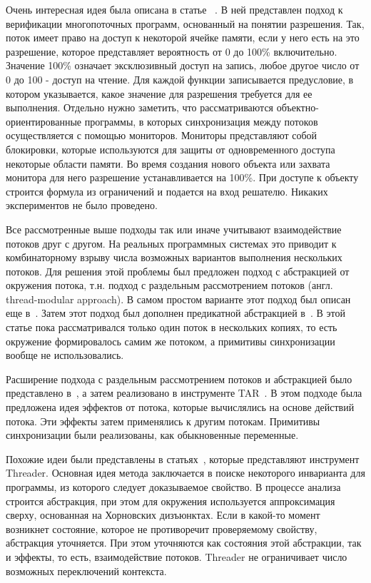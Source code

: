 Очень интересная идея была описана в статье ~\cite{Leino:2009}. В ней представлен подход к верификации многопоточных программ, основанный на понятии разрешения.
Так, поток имеет право на доступ к некоторой ячейке памяти, если у него есть на это разрешение, которое представляет вероятность от 0 до 100\% включительно.
Значение 100\% означает эксклюзивный доступ на запись, любое другое число от 0 до 100 - доступ на чтение.
Для каждой функции записывается предусловие, в котором указывается, какое значение для разрешения требуется для ее выполнения.
Отдельно нужно заметить, что рассматриваются объектно-ориентированные программы, в которых синхронизация между потоков осуществляется с помощью мониторов.
Мониторы представляют собой блокировки, которые используются для защиты от одновременного доступа некоторые области памяти.
Во время создания нового объекта или захвата монитора для него разрешение устанавливается на 100\%.
При доступе к объекту строится формула из ограничений и подается на вход решателю.
Никаких экспериментов не было проведено.

Все рассмотренные выше подходы так или иначе учитывают взаимодействие потоков друг с другом. 
На реальных программных системах это приводит к комбинаторному взрыву числа возможных вариантов выполнения нескольких потоков.
Для решения этой проблемы был предложен подход с абстракцией от окружения потока, т.н. подход с раздельным рассмотрением потоков (англ. thread-modular approach). 
В самом простом варианте этот подход был описан еще в~\cite{ThreadModular03}.
Затем этот подход был дополнен предикатной абстракцией в~\cite{Henzinger:2004}.
В этой статье пока рассматривался только один поток в нескольких копиях, то есть окружение формировалось самим же потоком, а примитивы синхронизации вообще не использовались.

Расширение подхода с раздельным рассмотрением потоков и абстракцией было представлено в~\cite{Malkis:2006}, а затем реализовано в инструменте TAR~\cite{TAR}.
В этом подходе была предложена идея эффектов от потока, которые вычислялись на основе действий потока. Эти эффекты затем применялись к другим потокам.
Примитивы синхронизации были реализованы, как обыкновенные переменные.

Похожие идеи были представлены в статьях~\cite{Threader:2011,Gupta:2011:POPL,Gupta:2011}, которые представляют инструмент Threader.
Основная идея метода заключается в поиске некоторого инварианта для программы, из которого следует доказываемое свойство.
В процессе анализа строится абстракция, при этом для окружения используется аппроксимация сверху, основанная на Хорновских дизъюнктах.
Если в какой-то момент возникнет состояние, которое не противоречит проверяемому свойству, абстракция уточняется.
При этом уточняются как состояния этой абстракции, так и эффекты, то есть, взаимодействие потоков.
Threader не ограничивает число возможных переключений контекста.

